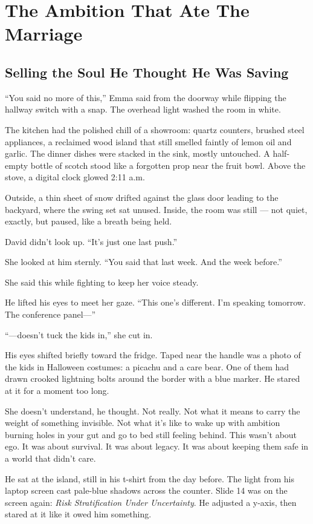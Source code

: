 \section{The Ambition That Ate The Marriage}

\subsection{Selling the Soul He Thought He Was Saving}

``You said no more of this,'' Emma said from the doorway while flipping the hallway switch with a snap. The overhead light 
washed the room in white.

The kitchen had the polished chill of a showroom: quartz counters, brushed steel appliances, a reclaimed wood island 
that still smelled faintly of lemon oil and garlic. The dinner dishes were stacked in the sink, mostly untouched. 
A half-empty bottle of scotch stood like a forgotten prop near the fruit bowl. Above the stove, a digital clock 
glowed 2:11 a.m.

Outside, a thin sheet of snow drifted against the glass door leading to the backyard, where the swing set sat unused. 
Inside, the room was still — not quiet, exactly, but paused, like a breath being held.

David didn’t look up. ``It’s just one last push.''

She looked at him sternly. ``You said that last week. And the week before.'' 

She said this while fighting to keep her voice steady.

He lifted his eyes to meet her gaze. ``This one’s different. I’m speaking tomorrow. The conference panel—''

``—doesn’t tuck the kids in,'' she cut in.

His eyes shifted briefly toward the fridge. Taped near the handle was a photo of the kids in Halloween costumes: a picachu 
and a care bear. One of them had drawn crooked lightning bolts around the border with a blue marker. He stared at it for a 
moment too long.

She doesn’t understand, he thought. Not really. Not what it means to carry the weight of something invisible. Not what it’s 
like to wake up with ambition burning holes in your gut and go to bed still feeling behind. This wasn’t about ego. It was 
about survival. It was about legacy. It was about keeping them safe in a world that didn’t care.

He sat at the island, still in his t-shirt from the day before. The light from his laptop screen cast pale-blue shadows 
across the counter. Slide 14 was on the screen again: \textit{Risk Stratification Under Uncertainty}. He adjusted a 
y-axis, then stared at it like it owed him something.

